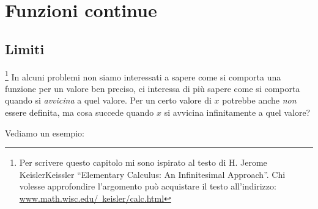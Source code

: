 


\chapter{Funzioni continue}

\section{Limiti}
\label{sec:cont_limiti}

\footnote{Per scrivere questo capitolo mi sono ispirato 
al testo di H. Jerome KeislerKeissler ``Elementary Calculus: An Infinitesimal 
Approach''. 
Chi volesse approfondire l'argomento può acquistare il testo 
all'indirizzo: 
\href{https://www.math.wisc.edu/~keisler/calc.html}
     {www.math.wisc.edu/~keisler/calc.html}}
In alcuni problemi non siamo interessati a sapere come si comporta una funzione 
per un valore ben preciso, ci interessa di più 
sapere come si comporta quando si \emph{avvicina} a quel valore.
Per un certo valore di $x$ potrebbe anche \emph{non} essere definita, ma 
cosa succede quando $x$ si avvicina infinitamente a quel valore?

Vediamo un esempio:

